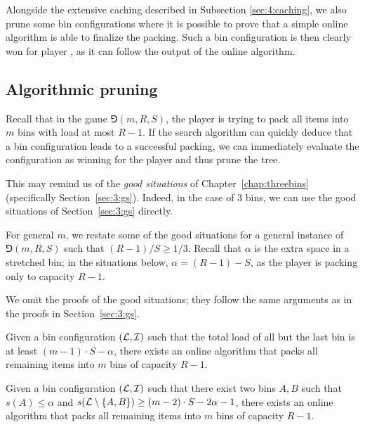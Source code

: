 Alongside the extensive caching described in Subsection
\ref{sec:4:caching}, we also prune some bin configurations where it is
possible to prove that a simple online algorithm is able to finalize
the packing. Such a bin configuration is then clearly won for player
\algo, as it can follow the output of the online algorithm.

\subsection{Algorithmic pruning}\label{sec:4:gs}

Recall that in the game $\Game(m,R,S)$, the player \algo is trying to
pack all items into $m$ bins with load at most $R-1$. If the search
algorithm can quickly deduce that a bin configuration leads to a
successful packing, we can immediately evaluate the configuration as
winning for the player \algo and thus prune the tree.

This may remind us of the \emph{good situations} of
Chapter~\ref{chap:threebins} (specifically Section~\ref{sec:3:gs}).
Indeed, in the case of $3$ bins, we can use the good situations of
Section~\ref{sec:3:gs} directly.

For general $m$, we restate some of the good situations for a general
instance of $\Game(m,R,S)$ such that $(R-1)/S \ge 1/3$. Recall that $\alpha$
is the extra space in a stretched bin; in the situations below, $\alpha = (R-1) -S$,
as the player \algo is packing only to capacity $R-1$.

We omit the proofs of the good situations; they follow the same
arguments as in the proofs in Section~\ref{sec:3:gs}.


\setcounter{goodsit}{0}

\begin{goodsit}\label{lem:gs1generic}
Given a bin configuration $({\mathcal L},{\mathcal I})$ such that the total load
of all but the last bin is at least $(m-1)\cdot S - \alpha$,
there exists an online algorithm that packs all remaining items into
$m$ bins of capacity $R-1$.
\end{goodsit}

\begin{goodsit}\label{lem:gs2generic}
Given a bin configuration $({\mathcal L},{\mathcal I})$ such that there exist
two bins $A,B$ such that $s(A) \le \alpha$ and
$s({\mathcal L} \setminus \{A,B\}) \ge (m-2)\cdot S - 2\alpha - 1 $,
there exists an online algorithm that packs all remaining items into
$m$ bins of capacity $R-1$.
\end{goodsit}

